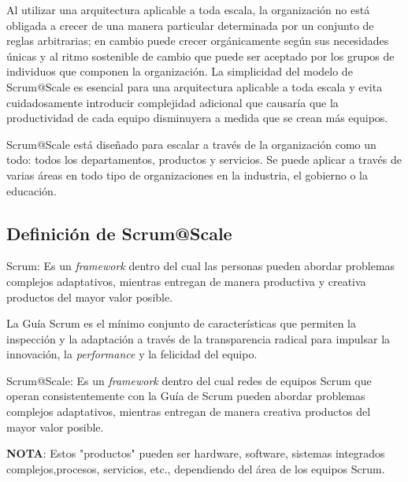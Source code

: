 \documentclass{article} %
\begin{document}
\noindent 

\noindent Al utilizar una arquitectura aplicable a toda escala, la organizaci\'{o}n no est\'{a} obligada a crecer de una manera particular determinada por un conjunto de reglas arbitrarias; en cambio puede crecer org\'{a}nicamente seg\'{u}n sus necesidades \'{u}nicas y al ritmo sostenible de cambio que puede ser aceptado por los grupos de individuos que componen la organizaci\'{o}n. La simplicidad del modelo de Scrum@Scale es esencial para una arquitectura aplicable a toda escala y evita cuidadosamente introducir complejidad adicional que causar\'{i}a que la productividad de cada equipo disminuyera a medida que se crean m\'{a}s equipos.

\noindent 

\noindent Scrum@Scale est\'{a} dise\~{n}ado para escalar a trav\'{e}s de la organizaci\'{o}n como un todo: todos los departamentos, productos y servicios. Se puede aplicar a trav\'{e}s de varias \'{a}reas en todo tipo de organizaciones en la industria, el gobierno o la educaci\'{o}n.

\noindent 
\subsection{Definici\'{o}n de Scrum@Scale}

\noindent 

\noindent Scrum: Es un \textit{framework }dentro del cual las personas pueden abordar problemas complejos adaptativos, mientras entregan de manera productiva y creativa productos del mayor valor posible.

\noindent 

\noindent La Gu\'{i}a Scrum es el m\'{i}nimo conjunto de caracter\'{i}sticas que permiten la inspecci\'{o}n y la adaptaci\'{o}n a trav\'{e}s de la transparencia radical para impulsar la innovaci\'{o}n, la \textit{performance }y la felicidad del equipo. 

\noindent 

\noindent Scrum@Scale: Es un \textit{framework }dentro del cual redes de equipos Scrum que operan consistentemente con la Gu\'{i}a de Scrum pueden abordar  problemas complejos adaptativos, mientras entregan de manera creativa productos del mayor valor posible. 

\noindent 

\noindent \textbf{NOTA}: Estos "productos" pueden ser hardware, software, sistemas integrados complejos,procesos, servicios, etc., dependiendo del \'{a}rea de los equipos Scrum.
\end{document}
